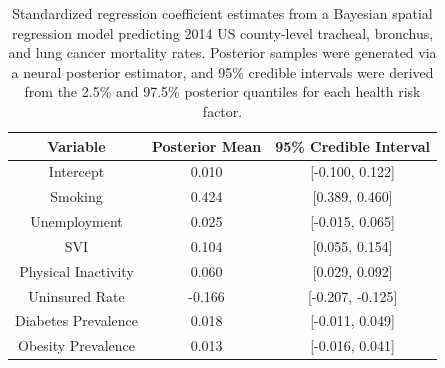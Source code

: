 \begin{table}[ht]
\centering
\begin{tabular}{ccc}
  \toprule
Variable & Posterior Mean & 95\% Credible Interval \\ 
  \midrule
Intercept & 0.010 & [-0.100, 0.122] \\ 
  Smoking & 0.424 & [0.389, 0.460] \\ 
  Unemployment & 0.025 & [-0.015, 0.065] \\ 
  SVI & 0.104 & [0.055, 0.154] \\ 
  Physical Inactivity & 0.060 & [0.029, 0.092] \\ 
  Uninsured Rate & -0.166 & [-0.207, -0.125] \\ 
  Diabetes Prevalence & 0.018 & [-0.011, 0.049] \\ 
  Obesity Prevalence & 0.013 & [-0.016, 0.041] \\ 
   \bottomrule
\end{tabular}
\caption{Standardized regression coefficient estimates from a Bayesian spatial regression model predicting 2014 US county-level tracheal, bronchus, and lung cancer mortality rates. Posterior samples were generated via a neural posterior estimator, and 95\% credible intervals were derived from the 2.5\% and 97.5\% posterior quantiles for each health risk factor.} 
\label{tab:beta_summary}
\end{table}
